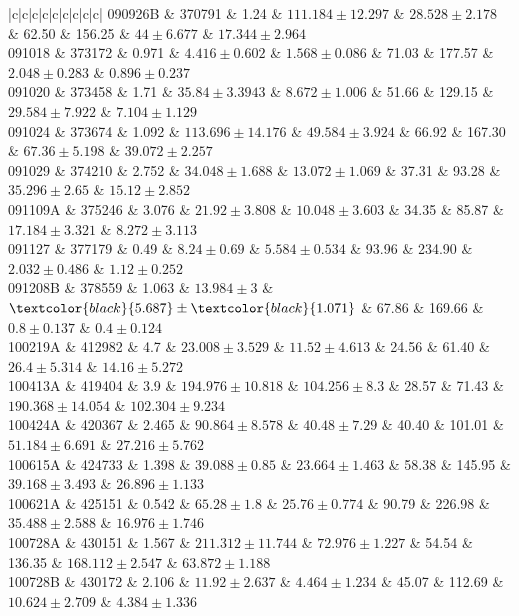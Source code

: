 \documentclass[prd,nofootinbib,preprintnumbers,floatfix]{revtex4}  %
\newcommand{\rthis}[1]{\textcolor{black}{#1}}
\begin{document}
\begin{center}
\begin{longtable*}{|c|c|c|c|c|c|c|c|c|}
090926B	&	370791	&	1.24	&	$	111.184	\pm	12.297	$	&	$	28.528	\pm	2.178	$	&	62.50	&	156.25	&	$	44	\pm	6.677	$	&	$	17.344	\pm	2.964	$	\\
091018	&	373172	&	0.971	&	$	4.416	\pm	0.602	$	&	$	1.568	\pm	0.086	$	&	71.03	&	177.57	&	$	2.048	\pm	0.283	$	&	$	0.896	\pm	0.237	$	\\
091020	&	373458	&	1.71	&	$	35.84	\pm	3.3943	$	&	$	8.672	\pm	1.006	$	&	51.66	&	129.15	&	$	29.584	\pm	7.922	$	&	$	7.104	\pm	1.129	$	\\
091024	&	373674	&	1.092	&	$	113.696	\pm	14.176	$	&	$	49.584	\pm	3.924	$	&	66.92	&	167.30	&	$	67.36	\pm	5.198	$	&	$	39.072	\pm	2.257	$	\\
091029	&	374210	&	2.752	&	$	34.048	\pm	1.688	$	&	$	13.072	\pm	1.069	$	&	37.31	&	93.28	&	$	35.296	\pm	2.65	$	&	$	15.12	\pm	2.852	$	\\
091109A	&	375246	&	3.076	&	$	21.92	\pm	3.808	$	&	$	10.048	\pm	3.603	$	&	34.35	&	85.87	&	$	17.184	\pm	3.321	$	&	$	8.272	\pm	3.113	$	\\
091127	&	377179	&	0.49	&	$	8.24	\pm	0.69	$	&	$	5.584	\pm	0.534	$	&	93.96	&	234.90	&	$	2.032	\pm	0.486	$	&	$	1.12	\pm	0.252	$	\\
091208B	&	378559	&	1.063	&	$	13.984	\pm	3	$	&	$	\rthis{5.687}	\pm	\rthis{1.071}	$	&	67.86	&	169.66	&	$	0.8	\pm	0.137	$	&	$	0.4	\pm	0.124	$	\\
100219A	&	412982	&	4.7	&	$	23.008	\pm	3.529	$	&	$	11.52	\pm	4.613	$	&	24.56	&	61.40	&	$	26.4	\pm	5.314	$	&	$	14.16	\pm	5.272	$	\\
100413A	&	419404	&	3.9	&	$	194.976	\pm	10.818	$	&	$	104.256	\pm	8.3	$	&	28.57	&	71.43	&	$	190.368	\pm	14.054	$	&	$	102.304	\pm	9.234	$	\\
100424A	&	420367	&	2.465	&	$	90.864	\pm	8.578	$	&	$	40.48	\pm	7.29	$	&	40.40	&	101.01	&	$	51.184	\pm	6.691	$	&	$	27.216	\pm	5.762	$	\\
100615A	&	424733	&	1.398	&	$	39.088	\pm	0.85	$	&	$	23.664	\pm	1.463	$	&	58.38	&	145.95	&	$	39.168	\pm	3.493	$	&	$	26.896	\pm	1.133	$	\\
100621A	&	425151	&	0.542	&	$	65.28	\pm	1.8	$	&	$	25.76	\pm	0.774	$	&	90.79	&	226.98	&	$	35.488	\pm	2.588	$	&	$	16.976	\pm	1.746	$	\\
100728A	&	430151	&	1.567	&	$	211.312	\pm	11.744	$	&	$	72.976	\pm	1.227	$	&	54.54	&	136.35	&	$	168.112	\pm	2.547	$	&	$	63.872	\pm	1.188	$	\\
100728B	&	430172	&	2.106	&	$	11.92	\pm	2.637	$	&	$	4.464	\pm	1.234	$	&	45.07	&	112.69	&	$	10.624	\pm	2.709	$	&	$	4.384	\pm	1.336	$	\\

\end{longtable*}
\end{center}
\end{document}
